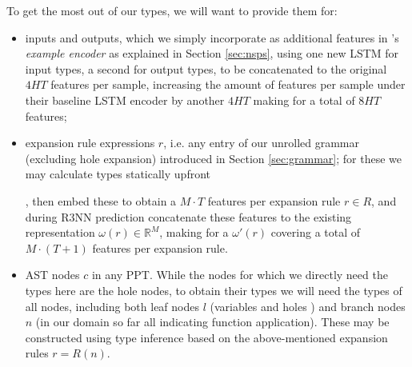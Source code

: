 \documentclass{article}
\begin{document}
To get the most out of our types, we will want to provide them for:
\begin{itemize}
    \item inputs and outputs,
    which we simply incorporate as additional features in \citet{nsps}'s
    \emph{example encoder} as explained in Section \ref{sec:nsps},
    using one new LSTM for input types, a second for output types,
    to be concatenated to the original $4HT$ features per sample,
    increasing the amount of features per sample under their baseline
    LSTM encoder by another $4HT$ making for a total of $8HT$ features;

    \item expansion rule expressions $r$, i.e. any entry of our unrolled grammar
    (excluding hole expansion) introduced in Section \ref{sec:grammar};
    for these we may calculate types statically upfront%


,
    then embed these to obtain a $M \cdot T$ features per expansion rule $r \in R$,
    and during R3NN prediction concatenate these features to the existing
    representation $\omega(r) \in \mathbb{R}^M$,
    making for a $\omega'(r)$ covering a total of $M \cdot (T+1)$ features per expansion rule.

    \item AST nodes $c$ in any PPT.
    While the nodes for which we directly need the types here are the hole nodes,
    to obtain their types we will need the types of all nodes,
    including both leaf nodes $l$ (variables and holes%
    )
    and branch nodes $n$ (in our domain so far all indicating function application).
    These may be constructed using type inference based on the above-mentioned expansion rules $r=R(n)$.


\end{itemize}
\end{document}
